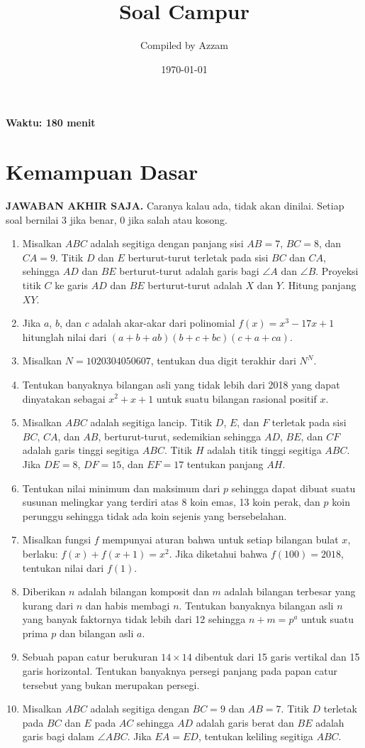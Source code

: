 \documentclass[12pt]{scrartcl}
\title{Soal Campur}
\author{Compiled by Azzam}
\date{\today}
\begin{document}
\maketitle

\renewcommand*\contentsname{Daftar Isi}
\tableofcontents

\newpage
\textbf{Waktu: 180 menit}

\section{Kemampuan Dasar}
\textbf{JAWABAN AKHIR SAJA.} Caranya kalau ada, tidak akan dinilai. Setiap soal bernilai 3 jika benar, 0 jika salah atau kosong.
\begin{enumerate}
    \item Misalkan $ABC$ adalah segitiga dengan panjang sisi $AB = 7$, $BC = 8$, dan $CA = 9$. Titik $D$ dan $E$ berturut-turut terletak pada sisi $BC$ dan $CA$, sehingga $AD$ dan $BE$ berturut-turut adalah garis bagi $\angle A$ dan $\angle B$. Proyeksi titik $C$ ke garis $AD$ dan $BE$ berturut-turut adalah $X$ dan $Y$. Hitung panjang $XY$.
    \item Jika $a$, $b$, dan $c$ adalah akar-akar dari polinomial $f(x) = x^3 - 17x + 1$ hitunglah nilai dari $(a + b + ab)(b + c + bc)(c + a + ca)$.
    \item Misalkan $N = 1020304050607$, tentukan dua digit terakhir dari $N^N$.
    \item Tentukan banyaknya bilangan asli yang tidak lebih dari 2018 yang dapat dinyatakan sebagai $x^2 + x + 1$ untuk suatu bilangan rasional positif $x$.
    \item Misalkan $ABC$ adalah segitiga lancip. Titik $D$, $E$, dan $F$ terletak pada sisi $BC$, $CA$, dan $AB$, berturut-turut, sedemikian sehingga $AD$, $BE$, dan $CF$ adalah garis tinggi segitiga $ABC$. Titik $H$ adalah titik tinggi segitiga $ABC$. Jika $DE = 8$, $DF = 15$, dan $EF = 17$ tentukan panjang $AH$.
    \item Tentukan nilai minimum dan maksimum dari $p$ sehingga dapat dibuat suatu susunan melingkar yang terdiri atas 8 koin emas, 13 koin perak, dan $p$ koin perunggu sehingga tidak ada koin sejenis yang bersebelahan.
    \item Misalkan fungsi $f$ mempunyai aturan bahwa untuk setiap bilangan bulat $x$, berlaku: $f(x) + f(x + 1) = x^2$. Jika diketahui bahwa $f(100) = 2018$, tentukan nilai dari $f(1)$.
    \item Diberikan $n$ adalah bilangan komposit dan $m$ adalah bilangan terbesar yang kurang dari $n$ dan habis membagi $n$. Tentukan banyaknya bilangan asli $n$ yang banyak faktornya tidak lebih dari 12 sehingga $n + m = p^a$ untuk suatu prima $p$ dan bilangan asli $a$.
    \item Sebuah papan catur berukuran $14 \times 14$ dibentuk dari 15 garis vertikal dan 15 garis horizontal. Tentukan banyaknya persegi panjang pada papan catur tersebut yang bukan merupakan persegi.
    \item Misalkan $ABC$ adalah segitiga dengan $BC = 9$ dan $AB = 7$. Titik $D$ terletak pada $BC$ dan $E$ pada $AC$ sehingga $AD$ adalah garis berat dan $BE$ adalah garis bagi dalam $\angle ABC$. Jika $EA = ED$, tentukan keliling segitiga $ABC$.


\end{enumerate}
\end{document}
